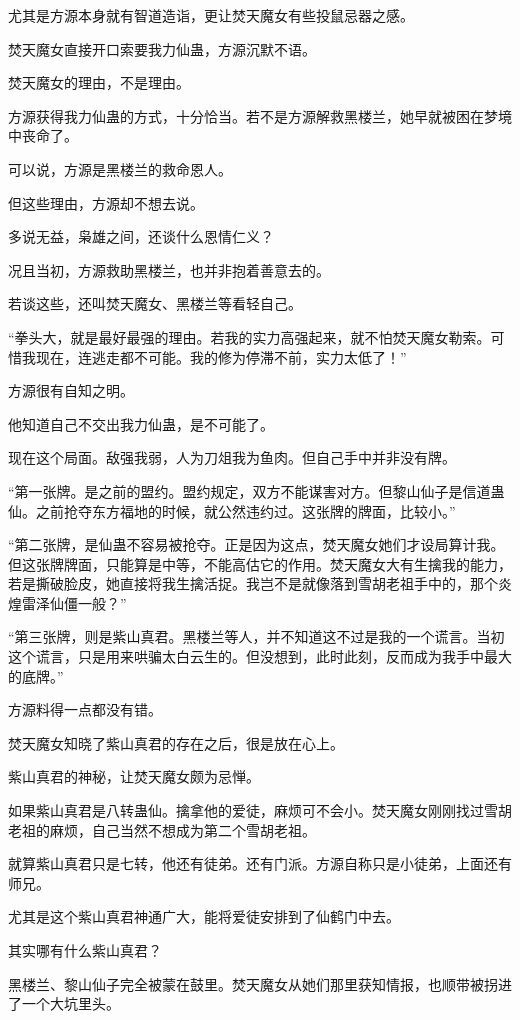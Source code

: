 \begin{this_body}
尤其是方源本身就有智道造诣，更让焚天魔女有些投鼠忌器之感。

焚天魔女直接开口索要我力仙蛊，方源沉默不语。

焚天魔女的理由，不是理由。

方源获得我力仙蛊的方式，十分恰当。若不是方源解救黑楼兰，她早就被困在梦境中丧命了。

可以说，方源是黑楼兰的救命恩人。

但这些理由，方源却不想去说。

多说无益，枭雄之间，还谈什么恩情仁义？

况且当初，方源救助黑楼兰，也并非抱着善意去的。

若谈这些，还叫焚天魔女、黑楼兰等看轻自己。

“拳头大，就是最好最强的理由。若我的实力高强起来，就不怕焚天魔女勒索。可惜我现在，连逃走都不可能。我的修为停滞不前，实力太低了！”

方源很有自知之明。

他知道自己不交出我力仙蛊，是不可能了。

现在这个局面。敌强我弱，人为刀俎我为鱼肉。但自己手中并非没有牌。

“第一张牌。是之前的盟约。盟约规定，双方不能谋害对方。但黎山仙子是信道蛊仙。之前抢夺东方福地的时候，就公然违约过。这张牌的牌面，比较小。”

“第二张牌，是仙蛊不容易被抢夺。正是因为这点，焚天魔女她们才设局算计我。但这张牌牌面，只能算是中等，不能高估它的作用。焚天魔女大有生擒我的能力，若是撕破脸皮，她直接将我生擒活捉。我岂不是就像落到雪胡老祖手中的，那个炎煌雷泽仙僵一般？”

“第三张牌，则是紫山真君。黑楼兰等人，并不知道这不过是我的一个谎言。当初这个谎言，只是用来哄骗太白云生的。但没想到，此时此刻，反而成为我手中最大的底牌。”

方源料得一点都没有错。

焚天魔女知晓了紫山真君的存在之后，很是放在心上。

紫山真君的神秘，让焚天魔女颇为忌惮。

如果紫山真君是八转蛊仙。擒拿他的爱徒，麻烦可不会小。焚天魔女刚刚找过雪胡老祖的麻烦，自己当然不想成为第二个雪胡老祖。

就算紫山真君只是七转，他还有徒弟。还有门派。方源自称只是小徒弟，上面还有师兄。

尤其是这个紫山真君神通广大，能将爱徒安排到了仙鹤门中去。

其实哪有什么紫山真君？

黑楼兰、黎山仙子完全被蒙在鼓里。焚天魔女从她们那里获知情报，也顺带被拐进了一个大坑里头。


\end{this_body}
